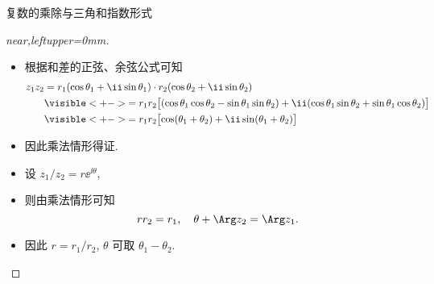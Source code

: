 \begin{frame}{复数的乘除与三角和指数形式}
	\onslide<+->
	\begin{proof}[near,leftupper=0mm]
		\begin{itemize}
			\item 根据和差的正弦、余弦公式可知
			\begin{align*}
				z_1z_2&=r_1(\cos\theta_1+\ii\sin\theta_1)\cdot
				r_2(\cos\theta_2+\ii\sin\theta_2)\\
				&\visible<+->{=r_1r_2\bigl[(\cos\theta_1\cos\theta_2-\sin\theta_1\sin\theta_2)
				+\ii(\cos\theta_1\sin\theta_2+\sin\theta_1\cos\theta_2)\bigr]}\\
				&\visible<+->{=r_1r_2\bigl[\cos(\theta_1+\theta_2)+\ii\sin(\theta_1+\theta_2)\bigr]}
			\end{align*}
			\item 因此乘法情形得证.
			\item 设 $z_1/z_2=r\ee^{\ii\theta}$,
			\item 则由乘法情形可知 
			\[
				rr_2=r_1,\quad \theta+\Arg z_2=\Arg z_1.
			\]
			\item 因此 $r=r_1/r_2$, $\theta$ 可取 $\theta_1-\theta_2$.\qedhere
		\end{itemize}
	\end{proof}
\end{frame}


